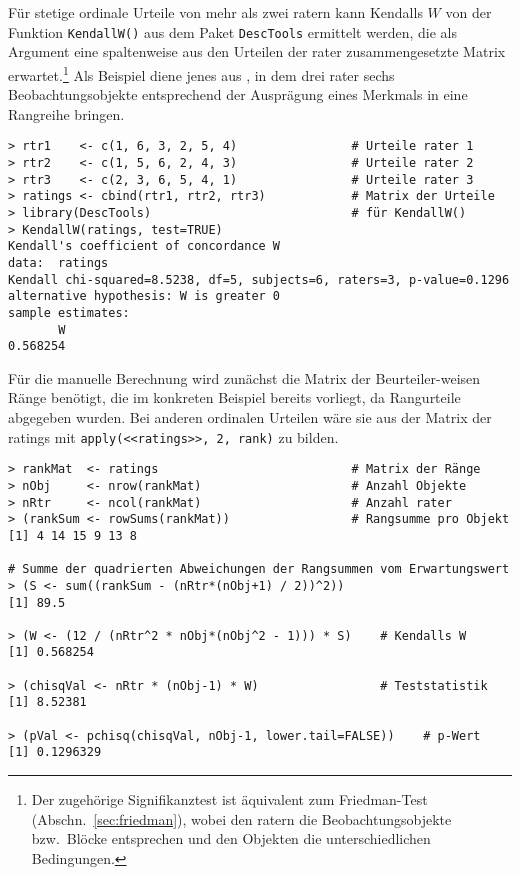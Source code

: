 Für stetige ordinale Urteile von mehr als zwei ratern kann Kendalls $W$ von der Funktion \lstinline!KendallW()! aus dem Paket \lstinline!DescTools! ermittelt werden, die als Argument eine spaltenweise aus den Urteilen der rater zusammengesetzte Matrix erwartet.\footnote{Der zugehörige Signifikanztest ist äquivalent zum Friedman-Test (Abschn.\ \ref{sec:friedman}), wobei den ratern die Beobachtungsobjekte bzw.\ Blöcke entsprechen und den Objekten die unterschiedlichen Bedingungen.} Als Beispiel diene jenes aus , in dem drei rater sechs Beobachtungsobjekte entsprechend der Ausprägung eines Merkmals in eine Rangreihe bringen.
\begin{lstlisting}
> rtr1    <- c(1, 6, 3, 2, 5, 4)                # Urteile rater 1
> rtr2    <- c(1, 5, 6, 2, 4, 3)                # Urteile rater 2
> rtr3    <- c(2, 3, 6, 5, 4, 1)                # Urteile rater 3
> ratings <- cbind(rtr1, rtr2, rtr3)            # Matrix der Urteile
> library(DescTools)                            # für KendallW()
> KendallW(ratings, test=TRUE)
Kendall's coefficient of concordance W
data:  ratings
Kendall chi-squared=8.5238, df=5, subjects=6, raters=3, p-value=0.1296
alternative hypothesis: W is greater 0
sample estimates:
       W
0.568254
\end{lstlisting}

Für die manuelle Berechnung wird zunächst die Matrix der Beurteiler-weisen Ränge benötigt, die im konkreten Beispiel bereits vorliegt, da Rangurteile abgegeben wurden. Bei anderen ordinalen Urteilen wäre sie aus der Matrix der ratings mit \lstinline!apply(<<ratings>>, 2, rank)! zu bilden.
\begin{lstlisting}
> rankMat  <- ratings                           # Matrix der Ränge
> nObj     <- nrow(rankMat)                     # Anzahl Objekte
> nRtr     <- ncol(rankMat)                     # Anzahl rater
> (rankSum <- rowSums(rankMat))                 # Rangsumme pro Objekt
[1] 4 14 15 9 13 8

# Summe der quadrierten Abweichungen der Rangsummen vom Erwartungswert
> (S <- sum((rankSum - (nRtr*(nObj+1) / 2))^2))
[1] 89.5

> (W <- (12 / (nRtr^2 * nObj*(nObj^2 - 1))) * S)    # Kendalls W
[1] 0.568254

> (chisqVal <- nRtr * (nObj-1) * W)                 # Teststatistik
[1] 8.52381

> (pVal <- pchisq(chisqVal, nObj-1, lower.tail=FALSE))    # p-Wert
[1] 0.1296329
\end{lstlisting}

